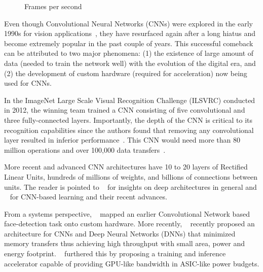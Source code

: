\begin{figure}[!htb]
\centering
{}
\caption{Frames per second}
\label{fig:face_fps}
\end{figure}

Even though Convolutional Neural Networks (CNNs) were explored in the early 1990s for vision applications~\cite{giles1997}, they have resurfaced again after a long hiatus and become extremely popular in the past couple of years. 
This successful comeback can be attributed to two major phenomena:
(1) the existence of large amount of data (needed to train the network well) with the evolution of the digital era, and (2) the development of 
custom hardware (required for acceleration) now being used for CNNs. 

In the ImageNet Large Scale Visual Recognition Challenge (ILSVRC)
conducted in 2012, the winning team trained a CNN consisting of five convolutional and three fully-connected layers. Importantly, the depth of the CNN is critical to 
its recognition capabilities since the authors found that removing any convolutional layer resulted in inferior performance~\cite{NIPS2012}. This CNN would need
more than 80 million operations and over 100,000 data transfers~\cite{XilinxCNN}.

More recent and advanced CNN architectures have 10 to 20 layers of Rectified Linear Units, hundreds of millions of weights, and billions of connections between units.
The reader is pointed to ~\cite{Bengio2009} for insights on deep architectures in general and ~\cite{DNNNature2015} for CNN-based learning and their recent advances. 

From a systems perspective, ~\cite{Farabet2009} mapped an earlier Convolutional Network based face-detection task onto custom hardware. More recently, ~\cite{Chen2014} recently proposed an architecture for CNNs and Deep 
Neural Networks (DNNs) that minimized memory transfers thus achieving high
throughput with small area, power and energy footprint. ~\cite{DaDianNao} furthered this by proposing a training and inference accelerator 
capable of providing GPU-like bandwidth in ASIC-like power budgets.
